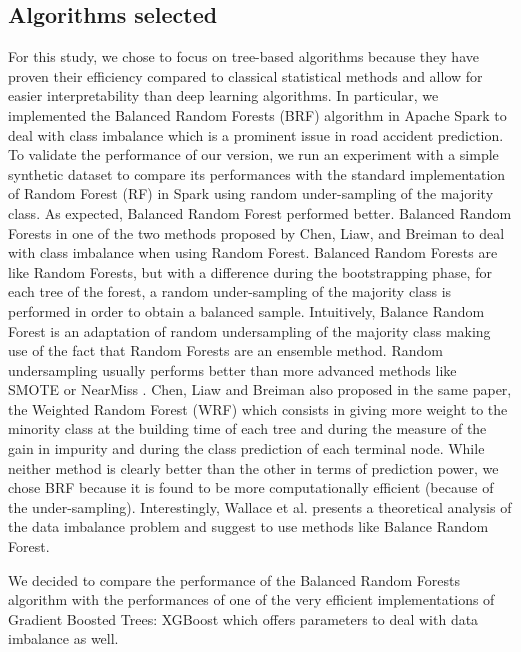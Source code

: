 \documentclass[conference]{IEEEtran}
\begin{document}
\subsection{Algorithms selected}
For this study, we chose to focus on tree-based algorithms because they have proven their efficiency compared to classical statistical methods and allow for easier interpretability than deep learning algorithms. In particular, we implemented the Balanced Random Forests (BRF) algorithm in Apache Spark to deal with class imbalance which is a prominent issue in road accident prediction. To validate the performance of our version, we run an experiment with a simple synthetic dataset to compare its performances with the standard implementation of Random Forest (RF) in Spark using random under-sampling of the majority class. As expected, Balanced Random Forest performed better. Balanced Random Forests in one of the two methods proposed by Chen, Liaw, and Breiman\cite{Chen2004} to deal with class imbalance when using Random Forest. Balanced Random Forests are like Random Forests, but with a difference during the bootstrapping phase, for each tree of the forest, a random under-sampling of the majority class is performed in order to obtain a balanced sample. Intuitively, Balance Random Forest is an adaptation of random undersampling of the majority class making use of the fact that Random Forests are an ensemble method. Random undersampling usually performs better than more advanced methods like SMOTE or NearMiss \cite{Branco2016}. Chen, Liaw and Breiman\cite{Chen2004} also proposed in the same paper, the Weighted Random Forest (WRF) which consists in giving more weight to the minority class at the building time of each tree and during the measure of the gain in impurity and during the class prediction of each terminal node. While neither method is clearly better than the other in terms of prediction power, we chose BRF because it is found to be more computationally efficient (because of the under-sampling). Interestingly, Wallace et al. \cite{Wallace2011} presents a theoretical analysis of the data imbalance problem and suggest to use methods like Balance Random Forest. 
	
We decided to compare the performance of the Balanced Random Forests algorithm with the performances of one of the very efficient implementations of Gradient Boosted Trees: XGBoost which offers parameters to deal with data imbalance as well.
\end{document}
